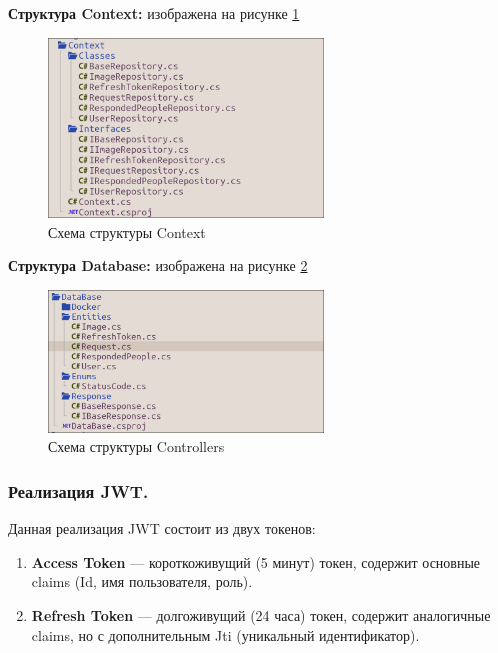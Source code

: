 \textbf{Структура Context:} изображена на рисунке \ref{fig:Context}
\begin{figure}[!h]
    \centering
    \includegraphics[width = 0.65\textwidth]{imgs/Context.png}
    \caption{Схема структуры Context}
    \label{fig:Context}
\end{figure}

\textbf{Структура Database:} изображена на рисунке \ref{fig:Database}
\begin{figure}[!h]
    \centering
    \includegraphics[width = 0.65\textwidth]{imgs/Database.png}
    \caption{Схема структуры Controllers}
    \label{fig:Database}
\end{figure}


\subsubsection{Реализация JWT.}
Данная реализация JWT состоит из двух токенов:
\begin{enumerate}
	\item{\textbf{Access Token} --- короткоживущий (5 минут) токен, содержит основные claims (Id, имя пользователя, роль).}
	\item{\textbf{Refresh Token} --- долгоживущий (24 часа) токен, содержит аналогичные claims, но с дополнительным Jti (уникальный идентификатор).}
\end{enumerate}

